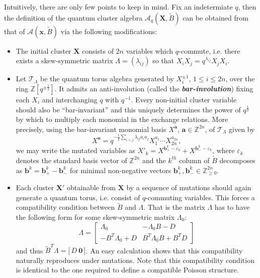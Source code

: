 \documentclass[12pt]{amsart}
\newcommand{\bfa}{\mathbf{a}}
\newcommand{\bfb}{\mathbf{b}}
\newcommand{\bfx}{\mathbf{x}}
\newcommand{\bfX}{\mathbf{X}}
\newcommand{\cA}{\mathcal{A}}
\newcommand{\cT}{\mathcal{T}}
\newcommand{\half}{{\frac{1}{2}}}
\newcommand{\ZZ}{\mathbb{Z}}
\newcommand{\newword}[1]{\textbf{\emph{#1}}}
\begin{document}
  Intuitively, there are only few points to keep in mind.
  Fix an indetermiate $q$, then the definition of the quantum cluster algebra $\cA_q(\bfX,\widetilde B)$ can be obtained from that of $\cA(\bfx,\widetilde B)$ via the following modifications:
  \begin{itemize}
    \item 
      The initial cluster $\bfX$ consists of $2n$ variables which $q$-commute, i.e. there exists a skew-symmetric matrix $\Lambda=(\lambda_{ij})$ so that $X_iX_j=q^{\lambda_{ij}}X_jX_i$.  
    
    \item 
      Let $\cT_\Lambda$ be the quantum torus algebra generated by $X_i^{\pm1}$, $1\le i\le 2n$, over the ring $\ZZ[q^{\pm\half}]$.
      It admits an anti-involution (called the \newword{bar-involution}) fixing each $X_i$ and interchanging $q$ with $q^{-1}$.
      Every non-initial cluster variable should also be ``bar-invariant'' and this uniquely determines the power of $q^\half$ by which to multiply each monomial in the exchange relations.  
      More precisely, using the bar-invariant monomial basis $X^\bfa$, $\bfa\in\ZZ^{2n}$, of $\cT_\Lambda$ given by
      \[
        X^\bfa=q^{-\half\sum\limits_{i<j}\lambda_{ij}a_ia_j}X_1^{a_1}\cdots X_{2n}^{a_{2n}},
      \]
      we may write the mutated variables as $X'_k=X^{\bfb_+^k-\varepsilon_k}+X^{\bfb_-^k-\varepsilon_k}$, where $\varepsilon_k$ denotes the standard basis vector of $\ZZ^{2n}$ and the $k^{th}$ column of $\widetilde{B}$ decomposes as $\bfb^k=\bfb^k_+-\bfb^k_-$ for minimal non-negative vectors $\bfb^k_+,\bfb^k_-\in\ZZ_{\ge0}^{2n}$.

    \item 
      Each cluster $\bfX'$ obtainable from $\bfX$ by a sequence of mutations should again generate a quantum torus, i.e. consist of $q$-commuting variables.
      This forces a compatibility condition between $\widetilde{B}$ and $\Lambda$.
      That is the matrix $\Lambda$ has to have the following form for some skew-symmetric matrix $\Lambda_0$:
      \[
        \Lambda
        =
        \left[
          \begin{array}{cc}
            \Lambda_0 & -\Lambda_0B-D\\ 
            -B^T\Lambda_0+D & B^T\Lambda_0B+B^TD
          \end{array}
        \right]
      \]
      and thus $\widetilde{B}^T\Lambda=\big[\,D\ \boldsymbol{0}\,\big]$.
      An easy calculation shows that this compatibility naturally reproduces under mutations.
      Note that this compatibility condition is identical to the one required to define a compatible Poisson structure.

  \end{itemize}
\end{document}
